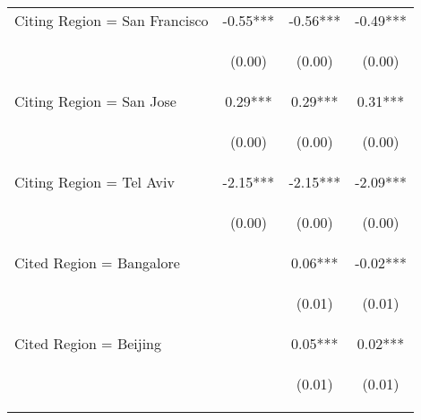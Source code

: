 \begin{center}
\begin{tabular}{lccc}
Citing Region = San Francisco & -0.55*** & -0.56*** & -0.49*** \\
\vspace{4pt} & \begin{footnotesize}(0.00)\end{footnotesize} & \begin{footnotesize}(0.00)\end{footnotesize} & \begin{footnotesize}(0.00)\end{footnotesize} \\
Citing Region = San Jose & 0.29*** & 0.29*** & 0.31*** \\
\vspace{4pt} & \begin{footnotesize}(0.00)\end{footnotesize} & \begin{footnotesize}(0.00)\end{footnotesize} & \begin{footnotesize}(0.00)\end{footnotesize} \\
Citing Region = Tel Aviv & -2.15*** & -2.15*** & -2.09*** \\
\vspace{4pt} & \begin{footnotesize}(0.00)\end{footnotesize} & \begin{footnotesize}(0.00)\end{footnotesize} & \begin{footnotesize}(0.00)\end{footnotesize} \\
Cited Region = Bangalore &  & 0.06*** & -0.02*** \\
\vspace{4pt} & \begin{footnotesize}\end{footnotesize} & \begin{footnotesize}(0.01)\end{footnotesize} & \begin{footnotesize}(0.01)\end{footnotesize} \\
Cited Region = Beijing &  & 0.05*** & 0.02*** \\
\vspace{4pt} & \begin{footnotesize}\end{footnotesize} & \begin{footnotesize}(0.01)\end{footnotesize} & \begin{footnotesize}(0.01)\end{footnotesize} \\

\end{tabular}
\end{center}
